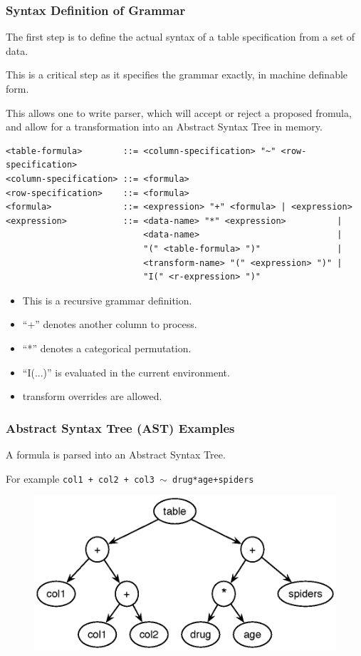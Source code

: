 \documentclass{beamer}
\begin{document}
  \begin{frame}
    \frametitle{Syntax Definition of Grammar}
   
    The first step is to define the actual syntax of a table specification
    from a set of data.

    This is a critical step as it specifies the grammar exactly, in machine
    definable form.

    This allows one to write parser, which will accept or reject a proposed fromula, and allow for a transformation into an Abstract Syntax Tree in memory.
   
  \end{frame} 

{\small
\begin{verbatim}
<table-formula>        ::= <column-specification> "~" <row-specification>
<column-specification> ::= <formula>
<row-specification>    ::= <formula>
<formula>              ::= <expression> "+" <formula> | <expression>
<expression>           ::= <data-name> "*" <expression>          | 
                           <data-name>                           |
                           "(" <table-formula> ")"               | 
                           <transform-name> "(" <expression> ")" |
                           "I(" <r-expression> ")"
\end{verbatim}
}   
\begin{itemize}
\item This is a recursive grammar definition.
\item ``+'' denotes another column to process.
\item ``*'' denotes a categorical permutation.
\item ``I(...)'' is evaluated in the current environment.
\item transform overrides are allowed.
\end{itemize}

  \begin{frame}
    \frametitle{Abstract Syntax Tree (AST) Examples}
    A formula is parsed into an Abstract Syntax Tree.

    For example \texttt{col1 + col2 + col3 $\sim$ drug*age+spiders}  
    \begin{figure}
      \includegraphics[scale=0.5]{ast1.eps}
    \end{figure}
  \end{frame}      
\end{document}
